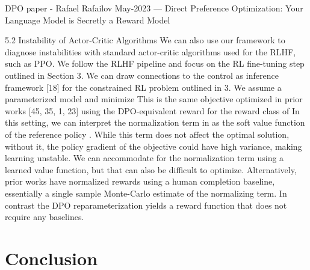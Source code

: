 \documentclass[a4paper, 12pt]{article}
\begin{document}
DPO paper - Rafael Rafailov May-2023 --- Direct Preference Optimization: Your Language Model is Secretly a Reward Model 

5.2 Instability of Actor-Critic Algorithms
We can also use our framework to diagnose instabilities with standard actor-critic algorithms used
for the RLHF, such as PPO. We follow the RLHF pipeline and focus on the RL fine-tuning step
outlined in Section 3. We can draw connections to the control as inference framework [18] for the
constrained RL problem outlined in 3. We assume a parameterized model and minimize
This is the same objective optimized in prior works [45, 35, 1, 23] using the DPO-equivalent reward
for the reward class of In this setting, we can interpret the normalization term in 
as the soft value function of the reference policy . While this term does not affect the optimal
solution, without it, the policy gradient of the objective could have high variance, making learning
unstable. We can accommodate for the normalization term using a learned value function, but that
can also be difficult to optimize. Alternatively, prior works have normalized rewards using a human
completion baseline, essentially a single sample Monte-Carlo estimate of the normalizing term. In
contrast the DPO reparameterization yields a reward function that does not require any baselines.

\section{Conclusion}



\end{document}
